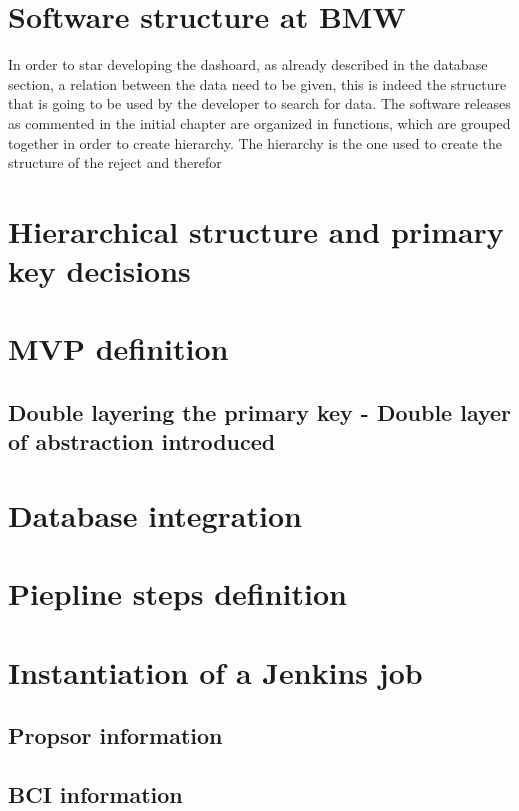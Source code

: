 \documentclass[../main.tex]{subfiles}
\begin{document}
\section{Software structure at BMW}
In order to star developing the dashoard, as already described in the database section, a relation between the data need to be given, this is indeed the structure that is going to be used by the developer to search for data. The software releases as commented in the initial chapter are organized in functions, which are grouped together in order to create hierarchy. The hierarchy is the one used to create the structure of the reject and therefor
\section{Hierarchical structure and primary key decisions}
\section{MVP definition}
\subsection{Double layering the primary key - Double layer of abstraction introduced}
\section{Database integration}
\section{Piepline steps definition}
\section{Instantiation of a Jenkins job}
\subsection{Propsor information}
\subsection{BCI information}
\cleardoublepage
\end{document}
